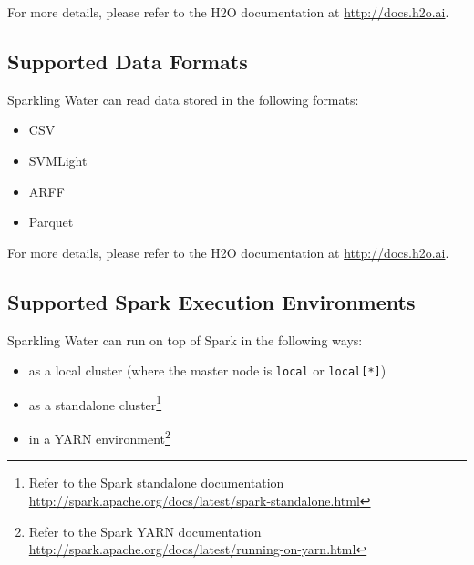 \documentclass{standalone}
\begin{document}
For more details, please refer to the H2O documentation at {\url{http://docs.h2o.ai}}.

\subsection{Supported Data Formats}

Sparkling Water can read data stored in the following formats:

\begin{itemize}

  \item CSV
  \item SVMLight
  \item ARFF
  \item Parquet
\end{itemize}

For more details, please refer to the H2O documentation at {\url{http://docs.h2o.ai}}.

\subsection{Supported Spark Execution Environments}
Sparkling Water can run on top of Spark in the following ways:
\begin{itemize}
  \item as a local cluster (where the master node is \texttt{local} or \texttt{local[*]})
  \item as a standalone cluster\footnote{Refer to the Spark standalone documentation
\url{http://spark.apache.org/docs/latest/spark-standalone.html}} 
\item in a YARN environment\footnote{Refer to the Spark YARN documentation \url{http://spark.apache.org/docs/latest/running-on-yarn.html}}

\end{itemize}
\end{document}
